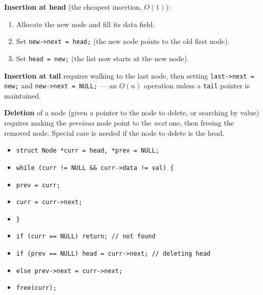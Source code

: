 \documentclass[11pt]{article}
\begin{document}
\textbf{Insertion at head} (the cheapest insertion, $O(1)$):
\begin{enumerate}
\item Allocate the new node and fill its data field.
\item Set \texttt{new->next = head;} (the new node points to the old first node).
\item Set \texttt{head = new;} (the list now starts at the new node).
\end{enumerate}

\textbf{Insertion at tail} requires walking to the last node, then setting \texttt{last->next = new;} and \texttt{new->next = NULL;} — an $O(n)$ operation unless a \texttt{tail} pointer is maintained.

\textbf{Deletion} of a node (given a pointer to the node to delete, or searching by value) requires making the \emph{previous} node point to the \emph{next} one, then freeing the removed node. Special care is needed if the node to delete is the head.

\begin{exemplebox}
\begin{itemize}
\item \texttt{struct Node *curr = head, *prev = NULL;}
\item \texttt{while (curr != NULL \&\& curr->data != val) \{}
\item \texttt{\quad prev = curr;}
\item \texttt{\quad curr = curr->next;}
\item \texttt{\}}
\item \texttt{if (curr == NULL) return; // not found}
\item \texttt{if (prev == NULL) head = curr->next; // deleting head}
\item \texttt{else prev->next = curr->next;}
\item \texttt{free(curr);}
\end{itemize}
\end{exemplebox}
\end{document}
